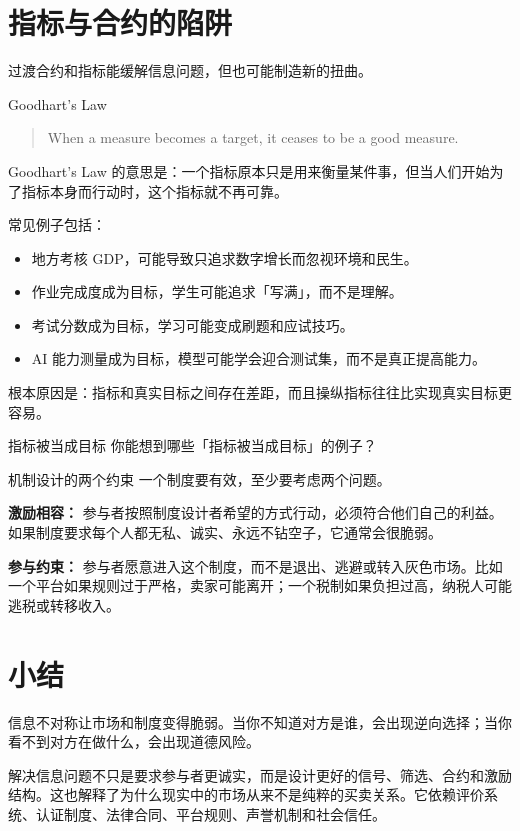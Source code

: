 \documentclass[10pt,a4paper]{ctexart}
\newcommand{\transitionnote}[1]{\begin{conceptbox}{过渡}#1\end{conceptbox}}
\begin{document}
\section{指标与合约的陷阱}

\transitionnote{合约和指标能缓解信息问题，但也可能制造新的扭曲。}

\begin{conceptbox}{Goodhart's Law}
\begin{quote}
When a measure becomes a target, it ceases to be a good measure.
\end{quote}

Goodhart's Law 的意思是：一个指标原本只是用来衡量某件事，但当人们开始为了指标本身而行动时，这个指标就不再可靠。
\end{conceptbox}

常见例子包括：
\begin{itemize}
  \item 地方考核 GDP，可能导致只追求数字增长而忽视环境和民生。
  \item 作业完成度成为目标，学生可能追求「写满」，而不是理解。
  \item 考试分数成为目标，学习可能变成刷题和应试技巧。
  \item AI 能力测量成为目标，模型可能学会迎合测试集，而不是真正提高能力。
\end{itemize}

根本原因是：指标和真实目标之间存在差距，而且操纵指标往往比实现真实目标更容易。

\begin{discussionbox}{指标被当成目标}
你能想到哪些「指标被当成目标」的例子？
\end{discussionbox}

\begin{conceptbox}{机制设计的两个约束}
一个制度要有效，至少要考虑两个问题。

\textbf{激励相容：} 参与者按照制度设计者希望的方式行动，必须符合他们自己的利益。如果制度要求每个人都无私、诚实、永远不钻空子，它通常会很脆弱。

\textbf{参与约束：} 参与者愿意进入这个制度，而不是退出、逃避或转入灰色市场。比如一个平台如果规则过于严格，卖家可能离开；一个税制如果负担过高，纳税人可能逃税或转移收入。
\end{conceptbox}

\section{小结}

信息不对称让市场和制度变得脆弱。当你不知道对方是谁，会出现逆向选择；当你看不到对方在做什么，会出现道德风险。

解决信息问题不只是要求参与者更诚实，而是设计更好的信号、筛选、合约和激励结构。这也解释了为什么现实中的市场从来不是纯粹的买卖关系。它依赖评价系统、认证制度、法律合同、平台规则、声誉机制和社会信任。
\end{document}
